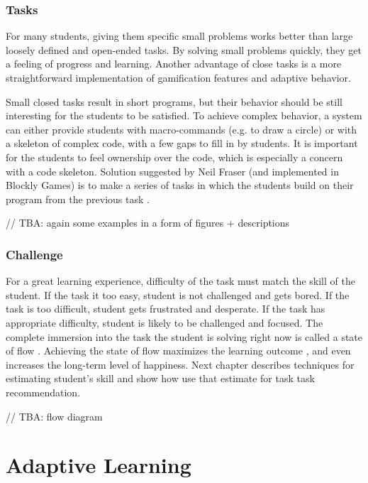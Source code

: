 \documentclass[
    digital,    %
    oneside,    %
    color,
    11pt,
    nocover,
    notable,
    nolof,
    nolot,
    final
]{fithesis3}
\begin{document}
\subsection{Tasks}
\label{sec:motivation.tasks}
For many students, giving them specific small problems works better
  than large loosely defined and open-ended tasks.
By solving small problems quickly,
  they get a feeling of progress and learning.
Another advantage of close tasks
  is a more straightforward implementation of gamification features and adaptive behavior.

Small closed tasks result in short programs,
  but their behavior should be still interesting for the students to be satisfied.
To achieve complex behavior,
  a system can either provide students with macro-commands (e.g. to draw a circle)
  or with a skeleton of complex code, with a few gaps to fill in by students.
It is important for the students to feel ownership over the code,
  which is especially a concern with a code skeleton.
Solution suggested by Neil Fraser (and implemented in Blockly Games)
  is to make a series of tasks in which the students
  build on their program from the previous task
  \cite{blockly-10-things}.

// TBA: again some examples in a form of figures + descriptions



\subsection{Challenge}
\label{sec:motivation.challenge}
For a great learning experience,
  difficulty of the task must match the skill of the student.
If the task it too easy,
  student is not challenged and gets bored.
If the task is too difficult,
  student gets frustrated and desperate.
If the task has appropriate difficulty,
  student is likely to be challenged and focused.
The complete immersion into the task the student is solving right now is called
  a state of flow \cite{flow}.
Achieving the state of flow maximizes the learning outcome \cite{adaptive-practice},
  and even increases the long-term level of happiness. %
Next chapter describes techniques for estimating student’s skill
  and show how use that estimate for task task recommendation.

// TBA: flow diagram


\chapter{Adaptive Learning}
\label{chap:adaptive-learning}
\end{document}
